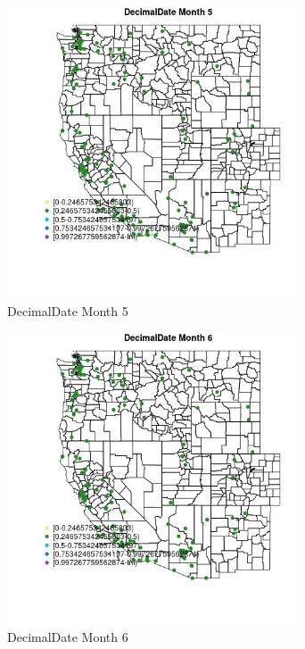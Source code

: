 \begin{figure} 
\centering  
\includegraphics[width=0.77\textwidth]{Code_Outputs/Report_ML_input_PM25_Step4_part_e_de_duplicated_aves_MapObsMo5DecimalDate.jpg} 
\caption{\label{fig:Report_ML_input_PM25_Step4_part_e_de_duplicated_avesMapObsMo5DecimalDate}DecimalDate Month 5} 
\end{figure} 
 

\begin{figure} 
\centering  
\includegraphics[width=0.77\textwidth]{Code_Outputs/Report_ML_input_PM25_Step4_part_e_de_duplicated_aves_MapObsMo6DecimalDate.jpg} 
\caption{\label{fig:Report_ML_input_PM25_Step4_part_e_de_duplicated_avesMapObsMo6DecimalDate}DecimalDate Month 6} 
\end{figure} 
 

